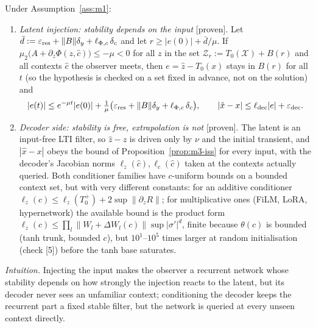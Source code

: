 \begin{proposition}\label{prop:m1-where}
Under Assumption~\ref{ass:m1}:
\begin{enumerate}
\item[(a)] \emph{Latent injection: stability depends on the input} [proven]. Let
$\bar d:=\varepsilon_{\rm res}+\|B\|\delta_y+\ell_{\Phi,c}\,\delta_c$ and let $r\ge|e(0)|+\bar d/\mu$. If
$\mu_2\big(A+\partial_z\Phi(z,\hat c)\big)\le-\mu<0$ for all $z$ in the set $\mathcal Z_r:=T_0(\mathcal X)+B(r)$ and all
contexts $\hat c$ the observer meets, then $e=\hat z-T_0(x)$ stays in $B(r)$ for all $t$ (so the hypothesis is
checked on a set fixed in advance, not on the solution) and
\[
|e(t)|\le e^{-\mu t}|e(0)|+\tfrac1\mu\big(\varepsilon_{\rm res}+\|B\|\delta_y+\ell_{\Phi,c}\,\delta_c\big),\qquad
|\hat x-x|\le\ell_{\rm dec}|e|+\varepsilon_{\rm dec}.
\]
\item[(b)] \emph{Decoder side: stability is free, extrapolation is not} [proven]. The latent is an input-free LTI filter,
so $\hat z-z$ is driven only by $\nu$ and the initial transient, and $|\hat x-x|$ obeys the bound of
Proposition~\ref{prop:m3-iss} for every input, with the decoder's Jacobian norms $\ell_z(\hat c),\ell_c(\hat c)$ taken at
the contexts actually queried. Both conditioner families have $c$-uniform bounds on a bounded context set, but with very
different constants: for an additive conditioner $\ell_z(c)\le\ell_z(T_0^+)+2\sup\|\partial_zR\|$; for multiplicative
ones (FiLM, LoRA, hypernetwork) the available bound is the product form
$\ell_z(c)\le\prod_l\|W_l+\Delta W_l(c)\|\sup|\sigma'|^{d}$, finite because $\theta(c)$ is bounded (tanh trunk, bounded
$c$), but $10^1$--$10^5$ times larger at random initialisation (check [5]) before the tanh base saturates.
\end{enumerate}
\end{proposition}
\noindent\emph{Intuition.} Injecting the input makes the observer a recurrent network whose stability depends on how
strongly the injection reacts to the latent, but its decoder never sees an unfamiliar context; conditioning the decoder
keeps the recurrent part a fixed stable filter, but the network is queried at every unseen context directly.
